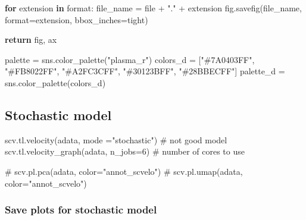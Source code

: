 \documentclass[
  letterpaper,
  DIV=11,
  numbers=noendperiod]{scrreprt}
\newenvironment{Shaded}{\begin{snugshade}}{\end{snugshade}}
\newcommand{\BuiltInTok}[1]{\textcolor[rgb]{0.00,0.23,0.31}{#1}}
\newcommand{\CommentTok}[1]{\textcolor[rgb]{0.37,0.37,0.37}{#1}}
\newcommand{\ControlFlowTok}[1]{\textcolor[rgb]{0.00,0.23,0.31}{\textbf{#1}}}
\newcommand{\DecValTok}[1]{\textcolor[rgb]{0.68,0.00,0.00}{#1}}
\newcommand{\KeywordTok}[1]{\textcolor[rgb]{0.00,0.23,0.31}{\textbf{#1}}}
\newcommand{\NormalTok}[1]{\textcolor[rgb]{0.00,0.23,0.31}{#1}}
\newcommand{\OperatorTok}[1]{\textcolor[rgb]{0.37,0.37,0.37}{#1}}
\newcommand{\StringTok}[1]{\textcolor[rgb]{0.13,0.47,0.30}{#1}}
\begin{document}
\begin{Shaded}
\begin{Highlighting}[]
    \ControlFlowTok{for}\NormalTok{ extension }\KeywordTok{in} \BuiltInTok{format}\NormalTok{:}
\NormalTok{        file\_name }\OperatorTok{=} \BuiltInTok{file} \OperatorTok{+} \StringTok{"."} \OperatorTok{+}\NormalTok{ extension}
\NormalTok{        fig.savefig(file\_name, }\BuiltInTok{format}\OperatorTok{=}\NormalTok{extension, bbox\_inches}\OperatorTok{=}\StringTok{\textquotesingle{}tight\textquotesingle{}}\NormalTok{)}
    
    \ControlFlowTok{return}\NormalTok{ fig, ax  }


\NormalTok{palette }\OperatorTok{=}\NormalTok{ sns.color\_palette(}\StringTok{"plasma\_r"}\NormalTok{)}
\NormalTok{colors\_d }\OperatorTok{=}\NormalTok{ [}\StringTok{"\#7A0403FF"}\NormalTok{, }\StringTok{"\#FB8022FF"}\NormalTok{, }\StringTok{"\#A2FC3CFF"}\NormalTok{, }\StringTok{"\#30123BFF"}\NormalTok{, }\StringTok{"\#28BBECFF"}\NormalTok{]}
\NormalTok{palette\_d }\OperatorTok{=}\NormalTok{ sns.color\_palette(colors\_d)}
\end{Highlighting}
\end{Shaded}

\subsection{Stochastic model}\label{stochastic-model}

\begin{Shaded}
\begin{Highlighting}[]
\NormalTok{scv.tl.velocity(adata, mode }\OperatorTok{=}\StringTok{"stochastic"}\NormalTok{) }\CommentTok{\# not good model}
\NormalTok{scv.tl.velocity\_graph(adata, n\_jobs}\OperatorTok{=}\DecValTok{6}\NormalTok{) }\CommentTok{\# number of cores to use}

\CommentTok{\# scv.pl.pca(adata, color="annot\_scvelo")}
\CommentTok{\# scv.pl.umap(adata, color="annot\_scvelo")}
\end{Highlighting}
\end{Shaded}

\subsubsection{Save plots for stochastic
model}\label{save-plots-for-stochastic-model}
\end{document}
